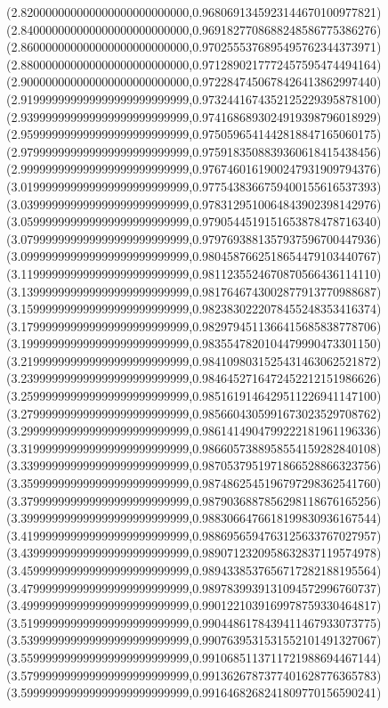 \documentclass[11pt]{report}
\begin{document}
\begin{center}
  (2.820000000000000000000000000,0.9680691345923144670100977821)
  (2.840000000000000000000000000,0.9691827708688248586775386276)
  (2.860000000000000000000000000,0.9702555376895495762344373971)
  (2.880000000000000000000000000,0.9712890217772457595474494164)
  (2.900000000000000000000000000,0.9722847450678426413862997440)
  (2.919999999999999999999999999,0.9732441674352125229395878100)
  (2.939999999999999999999999999,0.9741686893024919398796018929)
  (2.959999999999999999999999999,0.9750596541442818847165060175)
  (2.979999999999999999999999999,0.9759183508839360618415438456)
  (2.999999999999999999999999999,0.9767460161900247931909794376)
  (3.019999999999999999999999999,0.9775438366759400155616537393)
  (3.039999999999999999999999999,0.9783129510064843902398142976)
  (3.059999999999999999999999999,0.9790544519151653878478716340)
  (3.079999999999999999999999999,0.9797693881357937596700447936)
  (3.099999999999999999999999999,0.9804587662518654479103440767)
  (3.119999999999999999999999999,0.9811235524670870566436114110)
  (3.139999999999999999999999999,0.9817646743002877913770988687)
  (3.159999999999999999999999999,0.9823830222078455248353416374)
  (3.179999999999999999999999999,0.9829794511366415685838778706)
  (3.199999999999999999999999999,0.9835547820104479990473301150)
  (3.219999999999999999999999999,0.9841098031525431463062521872)
  (3.239999999999999999999999999,0.9846452716472452212151986626)
  (3.259999999999999999999999999,0.9851619146429511226941147100)
  (3.279999999999999999999999999,0.9856604305991673023529708762)
  (3.299999999999999999999999999,0.9861414904799222181961196336)
  (3.319999999999999999999999999,0.9866057388958554159282840108)
  (3.339999999999999999999999999,0.9870537951971866528866323756)
  (3.359999999999999999999999999,0.9874862545196797298362541760)
  (3.379999999999999999999999999,0.9879036887856298118676165256)
  (3.399999999999999999999999999,0.9883066476618199830936167544)
  (3.419999999999999999999999999,0.9886956594763125633767027957)
  (3.439999999999999999999999999,0.9890712320958632837119574978)
  (3.459999999999999999999999999,0.9894338537656717282188195564)
  (3.479999999999999999999999999,0.9897839939131094572996760737)
  (3.499999999999999999999999999,0.9901221039169978759330464817)
  (3.519999999999999999999999999,0.9904486178439411467933073775)
  (3.539999999999999999999999999,0.9907639531531552101491327067)
  (3.559999999999999999999999999,0.9910685113711721988694467144)
  (3.579999999999999999999999999,0.9913626787377401628776365783)
  (3.599999999999999999999999999,0.9916468268241809770156590241)

\end{center}
\end{document}

